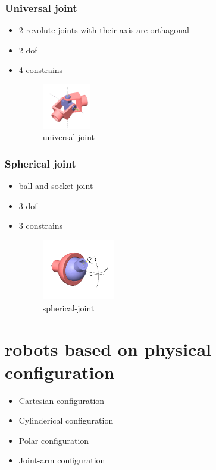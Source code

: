\documentclass{article}
\begin{document}
\subsubsection{Universal joint }
\begin{itemize}
	\item  2 revolute joints with their axis are orthagonal
	\item 2 dof
	\item 4 constrains
	      \begin{figure}[htpb]
		      \centering
		      \includegraphics[width=0.2\textwidth]{universal-joint}
		      \caption{universal-joint}
		      \label{fig:universal-joint}
	      \end{figure}
\end{itemize}
\subsubsection{Spherical joint}
\begin{itemize}
	\item ball and socket joint
	\item 3 dof
	\item 3 constrains
	      \begin{figure}[htpb]
		      \centering
		      \includegraphics[width=0.3\textwidth]{spherical-joint}
		      \caption{spherical-joint}
		      \label{fig:spherical-joint}
	      \end{figure}
\end{itemize}
\newpage
\section{robots based on physical configuration}
\begin{itemize}
	\item Cartesian configuration
	\item Cylinderical configuration
	\item Polar configuration
	\item Joint-arm configuration
\end{itemize}
\end{document}
